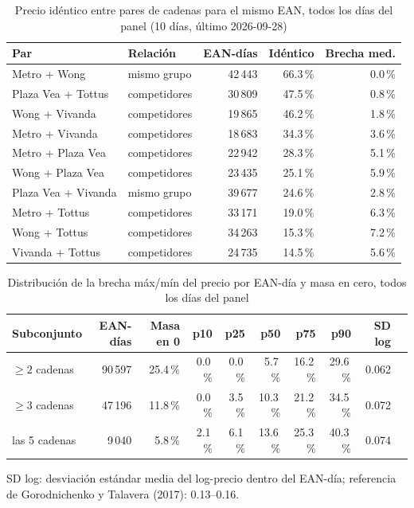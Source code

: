 
\begin{table}[htbp]
\caption{Precio id\'entico entre pares de cadenas para el mismo EAN, todos los d\'ias del panel (10 d\'ias, \'ultimo 2026-09-28)}
\label{tab:identidad}
\centering\scriptsize\setlength{\tabcolsep}{3pt}
\begin{tabular}{@{}llrrr@{}}
\toprule
Par & Relaci\'on & EAN-d\'ias & Id\'entico & Brecha med. \\
\midrule
Metro + Wong & mismo grupo & 42\,443 & 66.3\,\% & 0.0\,\% \\
Plaza Vea + Tottus & competidores & 30\,809 & 47.5\,\% & 0.8\,\% \\
Wong + Vivanda & competidores & 19\,865 & 46.2\,\% & 1.8\,\% \\
Metro + Vivanda & competidores & 18\,683 & 34.3\,\% & 3.6\,\% \\
Metro + Plaza Vea & competidores & 22\,942 & 28.3\,\% & 5.1\,\% \\
Wong + Plaza Vea & competidores & 23\,435 & 25.1\,\% & 5.9\,\% \\
Plaza Vea + Vivanda & mismo grupo & 39\,677 & 24.6\,\% & 2.8\,\% \\
Metro + Tottus & competidores & 33\,171 & 19.0\,\% & 6.3\,\% \\
Wong + Tottus & competidores & 34\,263 & 15.3\,\% & 7.2\,\% \\
Vivanda + Tottus & competidores & 24\,735 & 14.5\,\% & 5.6\,\% \\
\bottomrule\end{tabular}\end{table}

\begin{table}[t]
\caption{Distribuci\'on de la brecha m\'ax/m\'in del precio por EAN-d\'ia y masa en cero, todos los d\'ias del panel}
\label{tab:brecha}
\centering\scriptsize\setlength{\tabcolsep}{4pt}
\begin{tabular}{@{}lrrrrrrrrr@{}}
\toprule
Subconjunto & EAN-d\'ias & Masa en 0 & p10 & p25 & p50 & p75 & p90 & SD log \\
\midrule
$\geq 2$ cadenas & 90\,597 & 25.4\,\% & 0.0\,\% & 0.0\,\% & 5.7\,\% & 16.2\,\% & 29.6\,\% & 0.062 \\
$\geq 3$ cadenas & 47\,196 & 11.8\,\% & 0.0\,\% & 3.5\,\% & 10.3\,\% & 21.2\,\% & 34.5\,\% & 0.072 \\
las 5 cadenas & 9\,040 & 5.8\,\% & 2.1\,\% & 6.1\,\% & 13.6\,\% & 25.3\,\% & 40.3\,\% & 0.074 \\
\bottomrule\end{tabular}
\par\smallskip\raggedright\scriptsize SD log: desviaci\'on est\'andar media del log-precio dentro del EAN-d\'ia; referencia de Gorodnichenko y Talavera (2017): 0.13--0.16.
\end{table}

